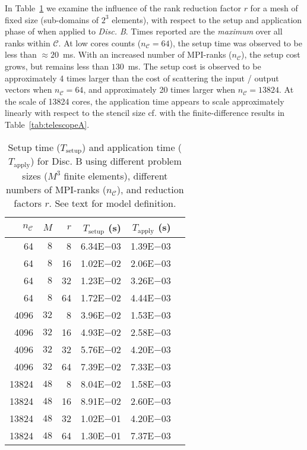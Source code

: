 \documentclass[]{siamart0216}
\begin{document}
In Table~\ref{tab:telescopeB} we examine the influence of the rank reduction factor $r$ for a mesh of fixed size 
(sub-domains of $2^3$ elements), with respect to the setup and application phase 
of  when applied to \emph{Disc. B}.
Times reported are the \textit{maximum} over all ranks within $\mathcal C$.
At low cores counts ($n_{\mathcal C} = 64$), the setup time was observed to be less than $\approx 20$~ms. 
With an increased number of MPI-ranks ($n_{\mathcal C}$), the setup cost grows, but remains less than $130$~ms.
The setup cost is observed to be approximately 4 times larger than the cost of scattering the input / output vectors 
when $n_{\mathcal C} = 64$, and approximately 20 times larger when $n_{\mathcal C} = 13824$. 
At the scale of 13824 cores, the application time appears to scale approximately linearly with respect to the stencil size cf. 
with the finite-difference results in Table~\ref{tab:telescopeA}.

\begin{table}[h!]
\centering
\caption{Setup time ($T_\mathrm{setup}$) and application time ($T_\mathrm{apply}$) for Disc. B using different problem sizes ($M^3$ finite elements), different numbers of MPI-ranks ($n_{\mathcal C}$), and reduction factors $r$. 
See text for model definition.}
\begin{tabular}{r r r r r r}
\toprule
$n_{\mathcal C}$     &$M$    &$r$    &$T_\text{setup}$ (s) &$T_\text{apply}$ (s)\\
\midrule
64                       &$8$         &8            &6.34E$-$03 &1.39E$-$03   \\
64                       &$8$         &16          &1.02E$-$02 &2.06E$-$03  \\
64                       &$8$         &32          &1.23E$-$02  &3.26E$-$03  \\
64                       &$8$         &64          &1.72E$-$02 &4.44E$-$03    \\
\midrule
4096                   &$32$         &8            &3.96E$-$02 &1.53E$-$03   \\
4096                   &$32$         &16          &4.93E$-$02 &2.58E$-$03   \\
4096                   &$32$         &32          &5.76E$-$02 &4.20E$-$03   \\
4096                   &$32$         &64          &7.39E$-$02 &7.33E$-$03   \\
\midrule
13824                 &$48$         &8            &8.04E$-$02 &1.58E$-$03   \\
13824                 &$48$         &16          &8.91E$-$02 &2.60E$-$03   \\
13824                 &$48$         &32          &1.02E$-$01 &4.20E$-$03   \\
13824                 &$48$         &64          &1.30E$-$01 &7.37E$-$03   \\
\bottomrule
\end{tabular}
\label{tab:telescopeB}
\end{table}
\end{document}
